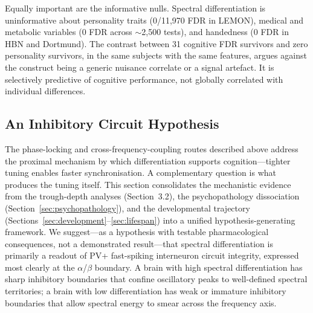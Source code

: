 Equally important are the informative nulls. Spectral differentiation is uninformative about personality traits (0/11,970 FDR in LEMON), medical and metabolic variables (0 FDR across $\sim$2,500 tests), and handedness (0 FDR in HBN and Dortmund). The contrast between 31 cognitive FDR survivors and zero personality survivors, in the same subjects with the same features, argues against the construct being a generic nuisance correlate or a signal artefact. It is selectively predictive of cognitive performance, not globally correlated with individual differences.

\subsection{An Inhibitory Circuit Hypothesis}
\label{sec:inhibitory}

The phase-locking and cross-frequency-coupling routes described above address the proximal mechanism by which differentiation supports cognition---tighter tuning enables faster synchronisation. A complementary question is what produces the tuning itself. This section consolidates the mechanistic evidence from the trough-depth analyses (Section~3.2), the psychopathology dissociation (Section~\ref{sec:psychopathology}), and the developmental trajectory (Sections~\ref{sec:development}--\ref{sec:lifespan}) into a unified hypothesis-generating framework. We suggest---as a hypothesis with testable pharmacological consequences, not a demonstrated result---that spectral differentiation is primarily a readout of PV+ fast-spiking interneuron circuit integrity, expressed most clearly at the $\alpha$/$\beta$ boundary. A brain with high spectral differentiation has sharp inhibitory boundaries that confine oscillatory peaks to well-defined spectral territories; a brain with low differentiation has weak or immature inhibitory boundaries that allow spectral energy to smear across the frequency axis.

